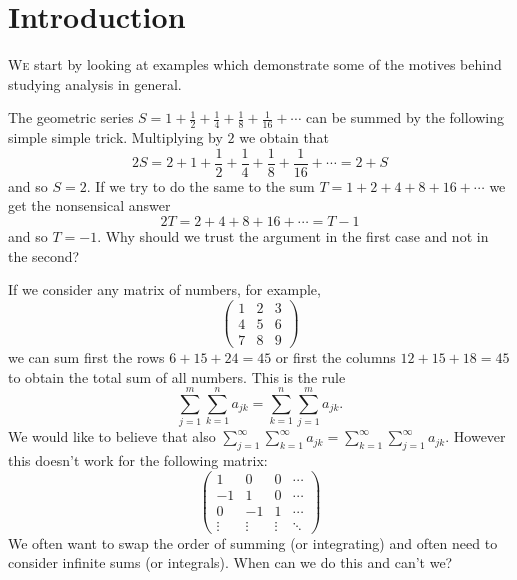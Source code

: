 \chapter{Introduction}

\lettrine{W}{e} start by looking at examples which demonstrate some of the motives behind studying analysis in general.
%
\begin{example*}[Series]
  The geometric series
  \(S = 1 + \frac{1}{2} + \frac{1}{4} + \frac{1}{8} + \frac{1}{16} + \cdots\)
  can be summed by the following simple simple trick.
  Multiplying by \(2\) we obtain that
  \[
    2S = 2 + 1 + \frac{1}{2} + \frac{1}{4} + \frac{1}{8} + \frac{1}{16} + \cdots = 2+S
  \]
  and so \(S=2\).
  If we try to do the same to the sum
  \(T = 1 + 2 + 4 + 8 + 16 + \cdots\)
  we get the nonsensical answer
  \[
    2T = 2 + 4 + 8 + 16 + \cdots = T -1
  \]
  and so \(T = -1\).
  Why should we trust the argument in the first case and not in the second?
\end{example*}


\begin{example*}
  If we consider any matrix of numbers, for example,
  \[
    \begin{pmatrix}
      1 & 2 & 3 \\
      4 & 5 & 6 \\
      7 & 8 & 9
    \end{pmatrix}
  \]
  we can sum first the rows \(6 + 15 + 24 = 45\) or first the columns \(12 + 15 + 18 = 45\) to obtain the total sum of all numbers.
  This is the rule
  \[
    \sum_{j=1}^{m} \sum_{k=1}^{n} a_{jk} = \sum_{k=1}^{n} \sum_{j=1}^{m}  a_{jk}.
  \]
  We would like to believe that also \(\sum_{j=1}^{\infty} \sum_{k=1}^{\infty} a_{jk} = \sum_{k=1}^{\infty} \sum_{j=1}^{\infty}  a_{jk}\).
  However this doesn't work for the following matrix:
  \[
    \begin{pmatrix}
      1      & 0      & 0      & \cdots \\
      -1     & 1      & 0      & \cdots \\
      0      & -1     & 1      & \cdots \\
      \vdots & \vdots & \vdots & \ddots
    \end{pmatrix}
  \]
  We often want to swap the order of summing (or integrating) and often need to consider infinite sums (or integrals).
  When can we do this and can't we?
\end{example*}

